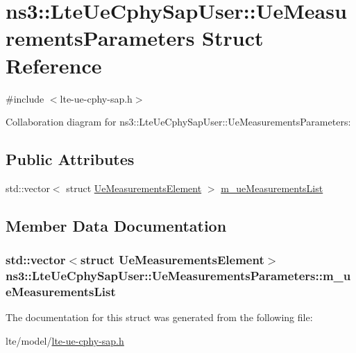 \hypertarget{structns3_1_1LteUeCphySapUser_1_1UeMeasurementsParameters}{}\section{ns3\+:\+:Lte\+Ue\+Cphy\+Sap\+User\+:\+:Ue\+Measurements\+Parameters Struct Reference}
\label{structns3_1_1LteUeCphySapUser_1_1UeMeasurementsParameters}


{\ttfamily \#include $<$lte-\/ue-\/cphy-\/sap.\+h$>$}



Collaboration diagram for ns3\+:\+:Lte\+Ue\+Cphy\+Sap\+User\+:\+:Ue\+Measurements\+Parameters\+:
\subsection*{Public Attributes}
\begin{DoxyCompactItemize}
\item 
std\+::vector$<$ struct \hyperlink{structns3_1_1LteUeCphySapUser_1_1UeMeasurementsElement}{Ue\+Measurements\+Element} $>$ \hyperlink{structns3_1_1LteUeCphySapUser_1_1UeMeasurementsParameters_afa38830b5c8f3874b593d56efd4a0e92}{m\+\_\+ue\+Measurements\+List}
\end{DoxyCompactItemize}


\subsection{Member Data Documentation}
\subsubsection[{\texorpdfstring{m\+\_\+ue\+Measurements\+List}{m_ueMeasurementsList}}]{\setlength{\rightskip}{0pt plus 5cm}std\+::vector$<$struct {\bf Ue\+Measurements\+Element}$>$ ns3\+::\+Lte\+Ue\+Cphy\+Sap\+User\+::\+Ue\+Measurements\+Parameters\+::m\+\_\+ue\+Measurements\+List}\hypertarget{structns3_1_1LteUeCphySapUser_1_1UeMeasurementsParameters_afa38830b5c8f3874b593d56efd4a0e92}{}\label{structns3_1_1LteUeCphySapUser_1_1UeMeasurementsParameters_afa38830b5c8f3874b593d56efd4a0e92}


The documentation for this struct was generated from the following file\+:\begin{DoxyCompactItemize}
\item 
lte/model/\hyperlink{lte-ue-cphy-sap_8h}{lte-\/ue-\/cphy-\/sap.\+h}\end{DoxyCompactItemize}
